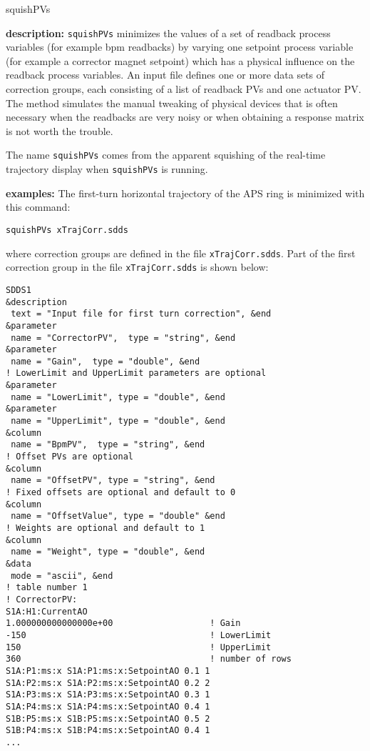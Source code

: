 \begin{sddsprog}{squishPVs}
\item \textbf{description:}
\verb+squishPVs+ minimizes the values of a set of readback process
variables (for example bpm readbacks) by varying one setpoint process
variable (for example a corrector magnet setpoint) which has
a physical influence on the readback process variables.
An input file defines one or more data sets of correction groups, each
consisting of a list of readback PVs and one actuator PV.
The method simulates the manual tweaking of physical devices that is often necessary
when the readbacks are very noisy or when obtaining a response matrix is not
worth the trouble.

The name \verb+squishPVs+ comes from the apparent squishing of the real-time
trajectory display when \verb+squishPVs+ is running.
\item \textbf{examples:}
The first-turn horizontal trajectory of the APS ring is minimized with this command:
\begin{verbatim}
squishPVs xTrajCorr.sdds
\end{verbatim}
where correction groups are defined in the file \verb+xTrajCorr.sdds+.
Part of the first correction group in the file \verb+xTrajCorr.sdds+
is shown below:
\begin{verbatim}
SDDS1
&description
 text = "Input file for first turn correction", &end
&parameter
 name = "CorrectorPV",  type = "string", &end
&parameter
 name = "Gain",  type = "double", &end
! LowerLimit and UpperLimit parameters are optional
&parameter
 name = "LowerLimit", type = "double", &end
&parameter
 name = "UpperLimit", type = "double", &end
&column
 name = "BpmPV",  type = "string", &end
! Offset PVs are optional
&column
 name = "OffsetPV", type = "string", &end
! Fixed offsets are optional and default to 0
&column
 name = "OffsetValue", type = "double" &end
! Weights are optional and default to 1
&column
 name = "Weight", type = "double", &end
&data
 mode = "ascii", &end
! table number 1
! CorrectorPV:
S1A:H1:CurrentAO
1.000000000000000e+00                   ! Gain
-150                                    ! LowerLimit
150                                     ! UpperLimit
360                                     ! number of rows
S1A:P1:ms:x S1A:P1:ms:x:SetpointAO 0.1 1
S1A:P2:ms:x S1A:P2:ms:x:SetpointAO 0.2 2
S1A:P3:ms:x S1A:P3:ms:x:SetpointAO 0.3 1
S1A:P4:ms:x S1A:P4:ms:x:SetpointAO 0.4 1
S1B:P5:ms:x S1B:P5:ms:x:SetpointAO 0.5 2
S1B:P4:ms:x S1B:P4:ms:x:SetpointAO 0.4 1
...
\end{verbatim}



\end{sddsprog}
